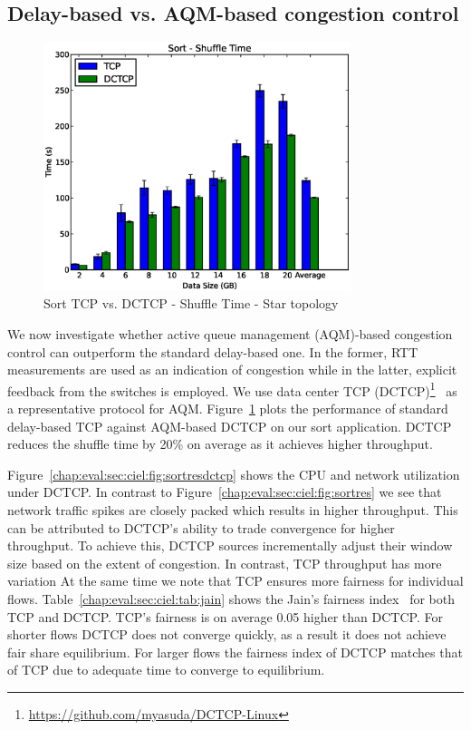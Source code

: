 \documentclass[a4paper,12pt,twoside,openright]{report}
\begin{document}
\subsection{Delay-based vs. AQM-based congestion control}
\begin{figure}[h!]
  \centering
    \includegraphics[width=0.8\textwidth]{shuffle_sort_dctcp.eps}
    \caption{Sort TCP vs. DCTCP - Shuffle Time - Star topology}
    \label{chap:eval:sec:ciel:fig:sortshuffledctcp}
\end{figure}

We now investigate whether active queue management (AQM)-based congestion
control can outperform the standard delay-based one. In the former, RTT
measurements are used as an indication of congestion while in the latter,
explicit feedback from the switches is employed. We use data center TCP
(DCTCP)\footnote{\url{https://github.com/myasuda/DCTCP-Linux}}~\cite{Alizadeh:2010:DCT}
as a representative protocol for AQM.
Figure~\ref{chap:eval:sec:ciel:fig:sortshuffledctcp} plots the performance of
standard delay-based TCP against AQM-based DCTCP on our sort application. DCTCP
reduces the shuffle time by 20\% on average as it achieves higher throughput.

Figure~\ref{chap:eval:sec:ciel:fig:sortresdctcp} shows the CPU and network
utilization under DCTCP. In contrast to
Figure~\ref{chap:eval:sec:ciel:fig:sortres} we see that network traffic spikes
are closely packed which results in higher throughput. This can be attributed to
DCTCP's ability to trade convergence for higher throughput. To achieve this,
DCTCP sources incrementally adjust their window size based on the extent of
congestion. In contrast, TCP throughput has more variation  At the same time we
note that TCP ensures more fairness for individual flows.
Table~\ref{chap:eval:sec:ciel:tab:jain} shows the Jain's fairness
index~\cite{Jain:1984:AQM} for both TCP and DCTCP. TCP's fairness is on average
0.05 higher than DCTCP. For shorter flows DCTCP does not converge quickly, as a
result it does not achieve fair share equilibrium. For larger flows the fairness
index of DCTCP matches that of TCP due to adequate time to converge to
equilibrium.
\end{document}
